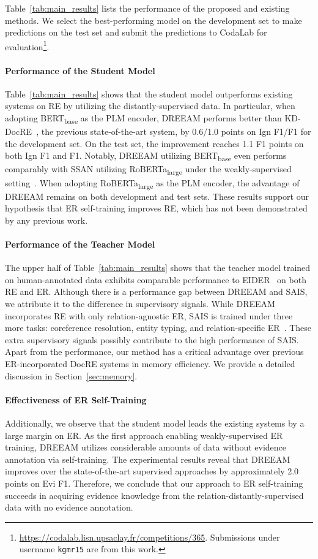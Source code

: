 \documentclass[11pt]{article}
\begin{document}
Table~\ref{tab:main_results} lists the performance of the proposed and existing methods.
We select the best-performing model on the development set to make predictions on the test set and submit the predictions to CodaLab for evaluation\footnote{\url{https://codalab.lisn.upsaclay.fr/competitions/365}. Submissions under username \texttt{kgmr15} are from this work.}.

\paragraph{Performance of the Student Model} Table~\ref{tab:main_results} shows that the student model outperforms existing systems on RE by utilizing the distantly-supervised data.
In particular, when adopting BERT\textsubscript{base} as the PLM encoder, DREEAM performs better than KD-DocRE~\cite{tan-etal-2022-document}, the previous state-of-the-art system, by 0.6/1.0 points on Ign F1/F1 for the development set.
On the test set, the improvement reaches 1.1 F1 points on both Ign F1 and F1.
Notably, DREEAM utilizing BERT\textsubscript{base} even performs comparably with SSAN utilizing RoBERTa\textsubscript{large} under the weakly-supervised setting~\cite{xu-etal-2021-ssan}.
When adopting RoBERTa\textsubscript{large} as the PLM encoder, the advantage of DREEAM remains on both development and test sets.
These results support our hypothesis that ER self-training improves RE, which has not been demonstrated by any previous work.

\paragraph{Performance of the Teacher Model} The upper half of Table~\ref{tab:main_results} shows that the teacher model trained on human-annotated data exhibits comparable performance to EIDER~\cite{xie-etal-2022-eider} on both RE and ER.
Although there is a performance gap between DREEAM and SAIS, we attribute it to the difference in supervisory signals.
While DREEAM incorporates RE with only relation-agnostic ER, SAIS is trained under three more tasks: coreference resolution, entity typing, and relation-specific ER~\cite{xiao-etal-2022-sais}.
These extra supervisory signals possibly contribute to the high performance of SAIS.
Apart from the performance, our method has a critical advantage over previous ER-incorporated DocRE systems in memory efficiency.
We provide a detailed discussion in Section~\ref{sec:memory}.

\paragraph{Effectiveness of ER Self-Training} Additionally, we observe that the student model leads the existing systems by a large margin on ER.
As the first approach enabling weakly-supervised ER training, DREEAM utilizes considerable amounts of data without evidence annotation via self-training.
The experimental results reveal that DREEAM improves over the state-of-the-art supervised approaches by approximately 2.0 points on Evi F1.
Therefore, we conclude that our approach to ER self-training succeeds in acquiring evidence knowledge from the relation-distantly-supervised data with no evidence annotation. 
\end{document}
